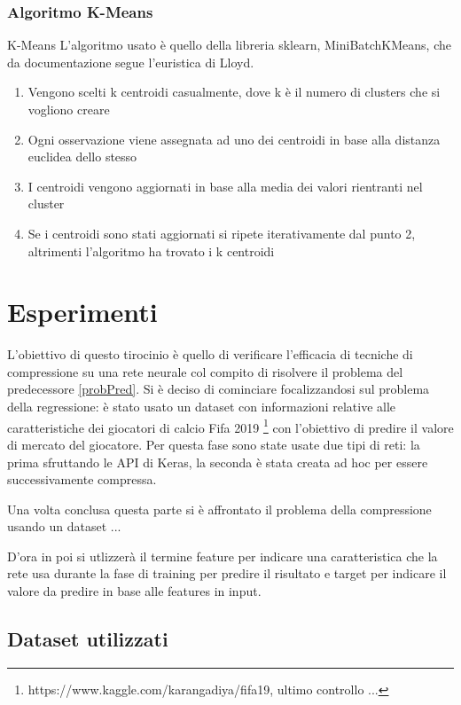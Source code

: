 \documentclass[12pt]{report}
\begin{document}
\subsection{Algoritmo K-Means}
K-Means
L’algoritmo usato è quello della libreria sklearn, MiniBatchKMeans, che da documentazione segue l’euristica di Lloyd.

\begin{enumerate}
\item{Vengono scelti k centroidi casualmente, dove k è il numero di clusters che si vogliono creare}
\item{Ogni osservazione viene assegnata ad uno dei centroidi in base alla distanza euclidea dello stesso}
\item{I centroidi vengono aggiornati in base alla media dei valori rientranti nel cluster}
\item{Se i centroidi sono stati aggiornati si ripete iterativamente dal punto 2, altrimenti l’algoritmo ha trovato i k centroidi}
\end{enumerate}
 

\chapter{Esperimenti}

L'obiettivo di questo tirocinio è quello di verificare l'efficacia di tecniche di compressione su una rete neurale col compito di risolvere il problema del predecessore \ref{probPred}.
Si è deciso di cominciare focalizzandosi sul problema della regressione: è stato usato un dataset con informazioni relative alle caratteristiche dei giocatori di calcio Fifa 2019 \footnote{https://www.kaggle.com/karangadiya/fifa19, ultimo controllo ...} con l’obiettivo di predire il valore di mercato del giocatore. Per questa fase sono state usate due tipi di reti: la prima sfruttando le API di Keras, la seconda è stata creata ad hoc per essere successivamente compressa.

Una volta conclusa questa parte si è affrontato il problema della compressione usando un dataset ...

D'ora in poi si utlizzerà il termine feature per indicare una caratteristica che la rete usa durante la fase di training per predire il risultato e target per indicare il valore da predire in base alle features in input.

\section{Dataset utilizzati}
\end{document}
